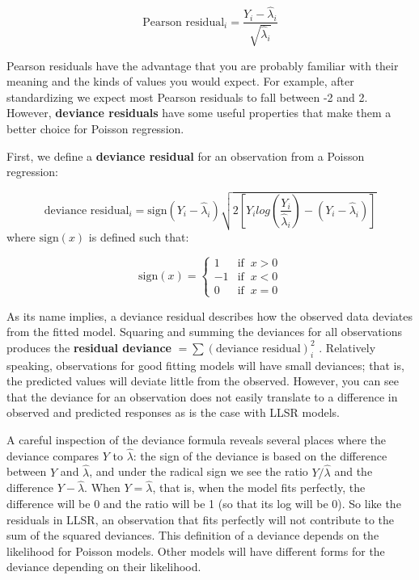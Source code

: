 \documentclass[
]{krantz}
\begin{document}
\begin{equation*}
\textrm{Pearson residual}_i = \frac{Y_i-\hat{\lambda}_i}{\sqrt{\hat{\lambda}_i}}
\end{equation*}

Pearson residuals have the advantage that you are probably familiar with their meaning and the kinds of values you would expect. For example, after standardizing we expect most Pearson residuals to fall between -2 and 2. However, \textbf{deviance residuals}  have some useful properties that make them a better choice for Poisson regression.

First, we define a \textbf{deviance residual} for an observation from a Poisson regression:

\begin{equation*}
\textrm{deviance residual}_i = \textrm{sign}(Y_i-\hat{\lambda}_i)
\sqrt{
2 \left[Y_i log\left(\frac{Y_i}{\hat{\lambda}_i}\right)
-(Y_i - \hat{\lambda}_i) \right]}
\end{equation*}
where \(\textrm{sign}(x)\) is defined such that:

\[ \textrm{sign}(x) = \begin{cases} 1  & \textrm{if }\ x > 0 \\
                                    -1 & \textrm{if }\ x < 0  \\
                                    0  & \textrm{if }\ x = 0\end{cases}\]

As its name implies, a deviance residual describes how the observed data deviates from the fitted model. Squaring and summing the deviances for all observations produces the \textbf{residual deviance} \(=\sum (\textrm{deviance residual})^2_i\) . Relatively speaking, observations for good fitting models will have small deviances; that is, the predicted values will deviate little from the observed. However, you can see that the deviance for an observation does not easily translate to a difference in observed and predicted responses as is the case with LLSR models.

A careful inspection of the deviance formula reveals several places where the deviance compares \(Y\) to \(\hat{\lambda}\): the sign of the deviance is based on the difference between \(Y\) and \(\hat{\lambda}\), and under the radical sign we see the ratio \(Y/\hat{\lambda}\) and the difference \(Y -\hat{\lambda}\). When \(Y = \hat{\lambda}\), that is, when the model fits perfectly, the difference will be 0 and the ratio will be 1 (so that its log will be 0). So like the residuals in LLSR, an observation that fits perfectly will not contribute to the sum of the squared deviances. This definition of a deviance depends on the likelihood for Poisson models. Other models will have different forms for the deviance depending on their likelihood.
\end{document}
